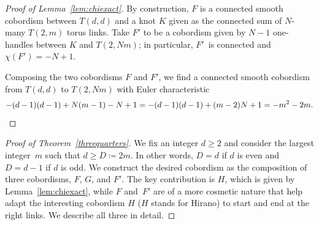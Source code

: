 \begin{proof}[Proof of Lemma~\ref{lem:chiexact}]
By construction, $F$ is a connected smooth cobordism between $T(d,d)$ and a knot $K$ given as the connected sum of $N$-many $T(2,m)$ torus links. Take $F'$ to be a cobordism given by $N-1$ one-handles between $K$ and $T(2,Nm)$; in particular, $F'$~is connected and $\chi(F')=-N+1$.

Composing the two cobordisms $F$ and $F'$, we find a connected smooth cobordism from $T(d,d)$ to $T(2,Nm)$ with Euler characteristic
\[
-(d-1)(d-1)+N(m-1)-N+1=-(d-1)(d-1)+(m-2)N+1=-m^2-2m.\qedhere
\]
\end{proof}

\begin{proof}[Proof of Theorem~\ref{threequarters}]
We fix an integer $d\geq 2$ and consider the largest integer~$m$ such that $d\geq D\coloneqq 2m$. In other words, $D=d$ if $d$ is even and $D=d-1$ if $d$ is odd. We construct the desired cobordism as the composition of three cobordisms, $F$, $G$, and $F'$. The key contribution is $H$, which is given by Lemma~\ref{lem:chiexact}, while $F$ and~$F'$ are of a more cosmetic nature that help adapt the interesting cobordism $H$ ($H$ stands for Hirano) to start and end at the right links. We describe all three in detail.


\end{proof}
